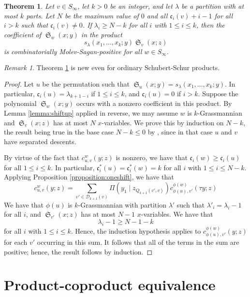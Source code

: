\documentclass{amsart}
\newtheorem{theorem}{Theorem}[section]
\theoremstyle{definition}
\theoremstyle{remark}
\newtheorem*{remark}{Remark}
\numberwithin{equation}{subsection}
\DeclareMathOperator{\sch}{\mathfrak{S}}
\newcommand{\smpfu}{\mathsf{\Pi}}
\newcommand{\smpre}[2]{\ensuremath{}\smpfu\left( #1 \mid #2\right)}
\newcommand{\shifthom}{\tau}
\newcommand{\code}{\mathfrak{c}}
\begin{document}
\begin{theorem} \label{theorem:schubschurpiece}
	Let $v\in S_\infty$, let $k>0$ be an integer, and let $\lambda$ be a partition with at most $k$ parts. Let $N$ be the maximum value of $0$ and all $\code_i(v)+i-1$ for all $i>k$ such that $\code_i(v)\neq 0$. If $\lambda_i\geq N-k$ for all $i$ with $1\leq i\leq k$, then the coefficient of $\sch_w(x;y)$ in the product
	$$s_{\lambda}(x_1,\ldots,x_k;y)\sch_v(x;z)$$
	is combinatorially Molev-Sagan-positive for all $w\in S_\infty$.
\end{theorem}

\begin{remark}
	Theorem \ref{theorem:schubschurpiece} is new even for ordinary Schubert-Schur products.
\end{remark}

\begin{proof}
	Let $u$ be the permutation such that $\sch_u(x;y)=s_\lambda(x_1,\ldots,x_k;y)$. In particular, $\code_i(u)=\lambda_{k+1-i}$ if $1\leq i\leq k$, and $\code_i(u)=0$ if $i>k$. Suppose the polynomial $\sch_w(x;y)$ occurs with a nonzero coefficient in this product. By Lemma \ref{lemma:shiftup} applied in reverse, we may assume $w$ is $k$-Grassmannian and $\sch_v(x;z)$ has at most $N$ $x$-variables. We prove this by induction on $N - k$, the result being true in the base case $N-k\leq 0$ by \cite[Theorem~3.1]{samuelmolev}, since in that case $u$ and $v$ have separated descents.
	
	By virtue of the fact that $c_{u,v}^w(y;z)$ is nonzero, we have that $\code_i(w)\geq \code_i(u)$ for all $1\leq i\leq k$. In particular, $\code_i^*(u)=\code_i^*(w)=k$ for all $i$ with $1\leq i\leq N-k$. Applying Proposition \ref{proposition:oneshift}, we have that
	$$c_{u,v}^w(y;z)=\sum_{v'\in \mathcal{D}_{k+1}(v)}\smpre{y_1}{z_{Q_{k+1}(v',v)}}c_{\phi(u),v'}^{\phi(w)}(\shifthom y;z)$$
We have that $\phi(u)$ is $k$-Grassmannian with partition $\lambda'$ such that $\lambda'_i=\lambda_i-1$ for all $i$, and $\sch_{v'}(x;z)$ has at most $N-1$ $x$-variables. We have that
$$\lambda_i-1\geq N-1-k$$
for all $i$ with $1\leq i\leq k$. Hence, the induction hypothesis applies to $c_{\phi(u),v'}^{\phi(w)}(y;z)$ for each $v'$ occurring in this sum. It follows that all of the terms in the sum are positive; hence, the result follows by induction.
\end{proof}


\section{Product-coproduct equivalence} \label{section:coprod}
\end{document}
